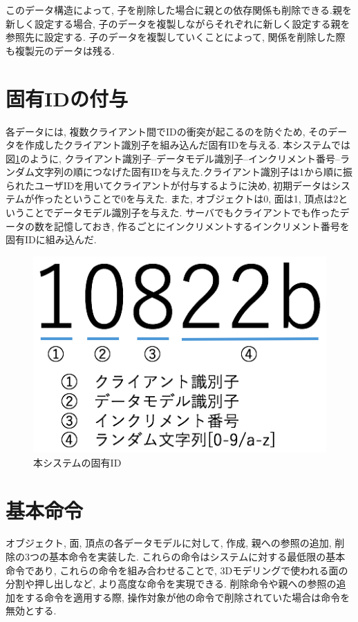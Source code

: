 このデータ構造によって, 子を削除した場合に親との依存関係も削除できる.親を新しく設定する場合, 子のデータを複製しながらそれぞれに新しく設定する親を参照先に設定する.
子のデータを複製していくことによって, 関係を削除した際も複製元のデータは残る.
\section{固有IDの付与} \label{固有id}
各データには, 複数クライアント間でIDの衝突が起こるのを防ぐため, そのデータを作成したクライアント識別子を組み込んだ固有IDを与える.
本システムでは図\ref{uuid}のように, クライアント識別子--データモデル識別子--インクリメント番号--ランダム文字列の順につなげた固有IDを与えた.クライアント識別子は1から順に振られたユーザIDを用いてクライアントが付与するように決め, 初期データはシステムが作ったということで0を与えた. また, オブジェクトは0, 面は1, 頂点は2ということでデータモデル識別子を与えた. サーバでもクライアントでも作ったデータの数を記憶しておき, 作るごとにインクリメントするインクリメント番号を固有IDに組み込んだ.
\begin{figure}[htbp]
  \begin{center}
    \includegraphics[scale=0.5]{images/uuid}
    \caption{本システムの固有ID}
    \label{uuid}
  \end{center}
\end{figure}
\section{基本命令} \label{ope}
オブジェクト, 面, 頂点の各データモデルに対して, 作成, 親への参照の追加, 削除の3つの基本命令を実装した.
これらの命令はシステムに対する最低限の基本命令であり, これらの命令を組み合わせることで, 3Dモデリングで使われる面の分割や押し出しなど, より高度な命令を実現できる.
削除命令や親への参照の追加をする命令を適用する際, 操作対象が他の命令で削除されていた場合は命令を無効とする.
